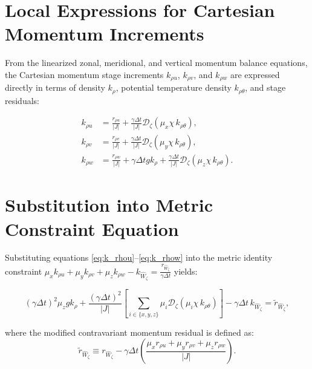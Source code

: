 \documentclass[11pt,a4paper]{article}
\begin{document}
		
		
		\section{Local Expressions for Cartesian Momentum Increments}
		
		From the linearized zonal, meridional, and vertical momentum balance equations, the Cartesian momentum stage increments $k_{\rho u}$, $k_{\rho v}$, and $k_{\rho w}$ are expressed directly in terms of density $k_\rho$, potential temperature density $k_{\rho \theta}$, and stage residuals:
		
		\begin{align}
			k_{\rho u} &= \frac{r_{\rho u}}{|J|} + \frac{\gamma \Delta t}{|J|} \mathcal{D}_\zeta \left( \mu_x \chi \, k_{\rho \theta} \right), \label{eq:k_rhou} \\[8pt]
			k_{\rho v} &= \frac{r_{\rho v}}{|J|} + \frac{\gamma \Delta t}{|J|} \mathcal{D}_\zeta \left( \mu_y \chi \, k_{\rho \theta} \right), \label{eq:k_rhov} \\[8pt]
			k_{\rho w} &= \frac{r_{\rho w}}{|J|} + \gamma \Delta t g k_\rho + \frac{\gamma \Delta t}{|J|} \mathcal{D}_\zeta \left( \mu_z \chi \, k_{\rho \theta} \right). \label{eq:k_rhow}
		\end{align}
		
		\section{Substitution into Metric Constraint Equation}
		
		Substituting equations \eqref{eq:k_rhou}--\eqref{eq:k_rhow} into the metric identity constraint $\mu_x k_{\rho u} + \mu_y k_{\rho v} + \mu_z k_{\rho w} - k_{\widehat{W}_\zeta} = \frac{r_{\widehat{W}_\zeta}}{\gamma \Delta t}$ yields:
		
		\begin{equation}
			(\gamma \Delta t)^2 \mu_z g k_\rho + \frac{(\gamma \Delta t)^2}{|J|} \left[ \sum_{i \in \{x,y,z\}} \mu_i \mathcal{D}_\zeta \left( \mu_i \chi \, k_{\rho \theta} \right) \right] - \gamma \Delta t \, k_{\widehat{W}_\zeta} = \widetilde{r}_{\widehat{W}_\zeta},
		\end{equation}
		
		where the modified contravariant momentum residual is defined as:
		\begin{equation}
			\widetilde{r}_{\widehat{W}_\zeta} \equiv r_{\widehat{W}_\zeta} - \gamma \Delta t \left( \frac{\mu_x r_{\rho u} + \mu_y r_{\rho v} + \mu_z r_{\rho w}}{|J|} \right).
		\end{equation}
		
\end{document}

